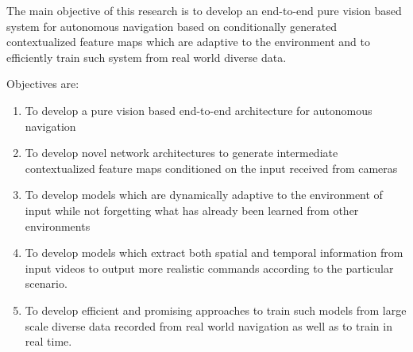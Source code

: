 The main objective of this research is to develop an end-to-end pure vision based system for autonomous navigation based on conditionally generated contextualized feature maps which are adaptive to the environment and to efficiently train such system from real world diverse data.

\begin{flushleft}
	Objectives are:
\end{flushleft}

\begin{enumerate}
\item To develop a pure vision based end-to-end architecture for autonomous navigation

\item To develop novel network architectures to generate intermediate contextualized feature maps conditioned on the input received from cameras

\item To develop models which are dynamically adaptive to the environment of input while not forgetting what has already been learned from other environments 

\item To develop models which extract both spatial and temporal information from input videos to output more realistic commands according to the particular scenario. 
 
\item To develop efficient and promising approaches to train such models from large scale diverse data recorded from real world navigation as well as to train in real time.  

\end{enumerate}
